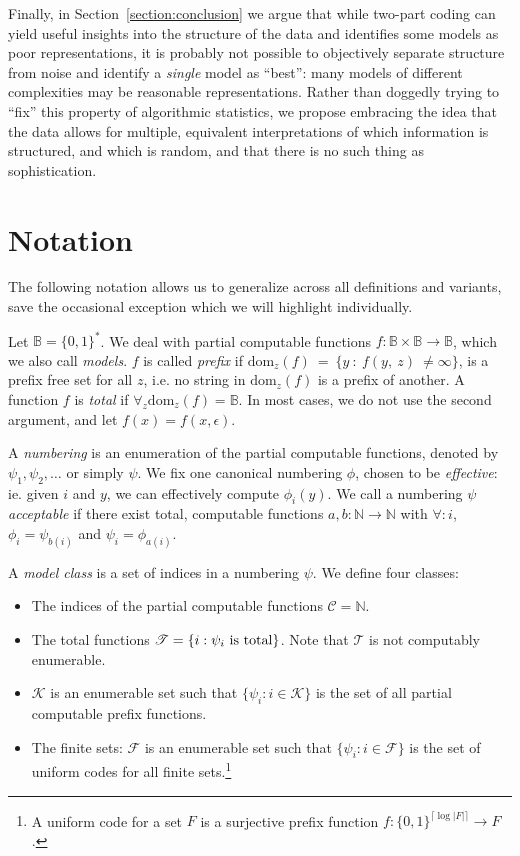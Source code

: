 \documentclass{style/llncs}
\newcommand{\C}{\mathscr C}
\newcommand{\T}{\mathscr T}
\newcommand{\F}{\mathscr F}
\newcommand{\K}{\mathscr K}
\newcommand{\B}{\mathbb B}
\newcommand{\N}{\mathbb N}
\newcommand{\tn}[1]{\textnormal{#1}}
\begin{document}
Finally, in Section~\ref{section:conclusion} we argue that while two-part coding can yield useful insights into the structure of the data and identifies some models as poor representations, it is probably not possible to objectively separate structure from noise and identify a \emph{single} model as ``best'': many models of different complexities may be reasonable representations. Rather than doggedly trying to ``fix'' this property of algorithmic statistics, we propose embracing the idea that the data allows for multiple, equivalent interpretations of which information is structured, and which is random, and that there is no such thing as sophistication.

\section{Notation}\enlargethispage{3\baselineskip}
The following notation allows us to generalize across all definitions and variants, save the occasional exception which we will highlight individually.

Let $\B = \{0,1\}^*$. We deal with partial computable functions $f: \B \times \B \to \B$, which we
also call \emph{models}. $f$ is called \emph{prefix} if $\text{dom}_z(f)~=~\{y~:~f(y,~z)~\neq \infty\}$, is a prefix free set for all $z$, i.e. no string in $\text{dom}_z(f)$ is a prefix of another. A function $f$ is \emph{total} if $\forall_z \text{dom}_z(f) = \B$. In most cases, we do not use the second argument, and let $f(x) = f(x, \epsilon)$.

A \emph{numbering} is an enumeration of the partial computable functions, denoted by $\psi_1, \psi_2, \ldots$ or simply $\psi$. We fix one canonical numbering $\phi$, chosen to be \emph{effective}: ie. given $i$ and $y$, we can effectively compute $\phi_i(y)$. We call a numbering $\psi$ \emph{acceptable} if there exist total, computable functions $a, b: \N \to \N$ with $\forall: i$, $\phi_i = \psi_{b(i)}$ and  $\psi_i = \phi_{a(i)}$.

A \emph{model class} is a set of indices in a numbering $\psi$. We define four classes:
\begin{itemize} 
  \item The indices of the partial computable functions $\C=\N$.
  \item The total functions $\T=\{i:\tn{$\psi_i$ is total}\}$. Note that $\T$ is not computably enumerable.
  \item $\K$ is an enumerable set such that $\{\psi_i:i\in\K\}$ is the set of all partial computable prefix functions.
  \item The finite sets: $\F$ is an enumerable set such that $\{\psi_i:i\in\F\}$ is the set of uniform codes for all finite sets.\footnote{A uniform code for a set $F$ is a surjective prefix function $f:\{0,1\}^{\lceil\log|F|\rceil}\to F$.}
\end{itemize}
\end{document}
